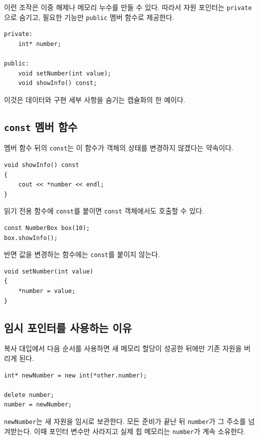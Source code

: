 \documentclass[11pt,a4paper]{article}
\begin{document}
이런 조작은 이중 해제나 메모리 누수를 만들 수 있다. 따라서 자원 포인터는 \texttt{private}으로 숨기고, 필요한 기능만 \texttt{public} 멤버 함수로 제공한다.

\begin{lstlisting}
private:
    int* number;

public:
    void setNumber(int value);
    void showInfo() const;
\end{lstlisting}

이것은 데이터와 구현 세부 사항을 숨기는 캡슐화의 한 예이다.

\subsection{\texttt{const} 멤버 함수}
멤버 함수 뒤의 \texttt{const}는 이 함수가 객체의 상태를 변경하지 않겠다는 약속이다.

\begin{lstlisting}
void showInfo() const
{
    cout << *number << endl;
}
\end{lstlisting}

읽기 전용 함수에 \texttt{const}를 붙이면 \texttt{const} 객체에서도 호출할 수 있다.

\begin{lstlisting}
const NumberBox box(10);
box.showInfo();
\end{lstlisting}

반면 값을 변경하는 함수에는 \texttt{const}를 붙이지 않는다.

\begin{lstlisting}
void setNumber(int value)
{
    *number = value;
}
\end{lstlisting}

\subsection{임시 포인터를 사용하는 이유}
복사 대입에서 다음 순서를 사용하면 새 메모리 할당이 성공한 뒤에만 기존 자원을 버리게 된다.

\begin{lstlisting}
int* newNumber = new int(*other.number);

delete number;
number = newNumber;
\end{lstlisting}

\texttt{newNumber}는 새 자원을 임시로 보관한다. 모든 준비가 끝난 뒤 \texttt{number}가 그 주소를 넘겨받는다. 이때 포인터 변수만 사라지고 실제 힙 메모리는 \texttt{number}가 계속 소유한다.
\end{document}
